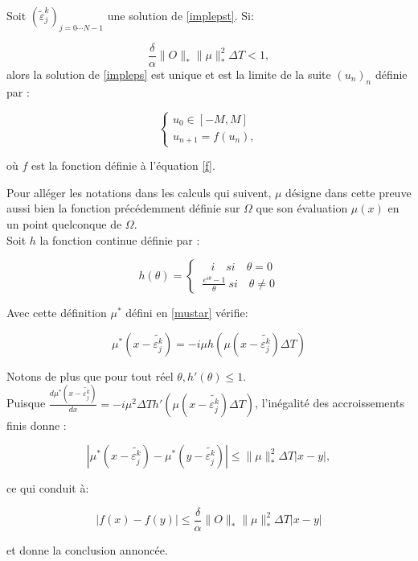 \begin{theorem} \label{theopicard}
	Soit $(\tilde{\varepsilon}_j^k)_{j = 0\cdots N-1}$ une solution de \eqref{implepst}. Si:
	
	\begin{equation} \label{cond2.26}
	\frac{\delta}{\alpha} \lVert O\rVert_* \lVert \mu \rVert^2_* \Delta T < 1,
	\end{equation}
	alors la solution de \eqref{impleps} est unique et est la limite de la suite $(u_n )_n$ définie par :
	
	\begin{equation}
	\begin{cases}
	u_0 \in [-M,M]\\
	u_{n+1} = f(u_n),
	\end{cases}
	\end{equation}
	
	où $f$ est la fonction définie à l'équation \eqref{f}.
	
\end{theorem}

\begin{ proof }
	
	Pour alléger les notations dans les calculs qui suivent, $\mu$ désigne dans cette preuve aussi bien la fonction précédemment définie sur $\Omega$ que son évaluation $\mu(x)$ en un point quelconque de $\Omega$.
	$ $
	\\Soit $h$ la fonction continue définie par :
	
	\begin{equation}
	h(\theta) = \begin{cases}
	\quad i \quad si \quad\theta = 0\\
	\ \frac{e^{i\theta}-1}{\theta}\ si\quad \theta \neq 0
	\end{cases}
	\end{equation}
	
	Avec cette définition $\mu^*$ défini en \eqref{mustar} vérifie:
	
	$$ \mu^*(x-\tilde{\varepsilon^k_j}) = -i\mu h (\mu(x-\tilde{\varepsilon^k_j}) \Delta T )$$
	
	Notons de plus que pour tout réel $ \theta, h'(\theta) \leq 1 $.
	\\Puisque $ \frac{d\mu^* (x-\tilde{\varepsilon^k_j})}{dx} = -i\mu^2 \Delta T h' (\mu(x-\tilde{\varepsilon^k_j})\Delta T) $, l'inégalité des accroissements finis donne :
	
	$$ |\mu^* (x-\tilde{\varepsilon^k_j}) - \mu^* (y-\tilde{\varepsilon^k_j})| \leq \lVert \mu \rVert _*^2 \Delta T |x-y|,  $$
	
	ce qui conduit à:
	
	$$ |f(x) - f(y)| \leq \frac{\delta}{\alpha} \lVert O\rVert_* \lVert \mu \rVert _*^2 \Delta T |x-y| $$
	
	et donne la conclusion annoncée.
\end{ proof }

